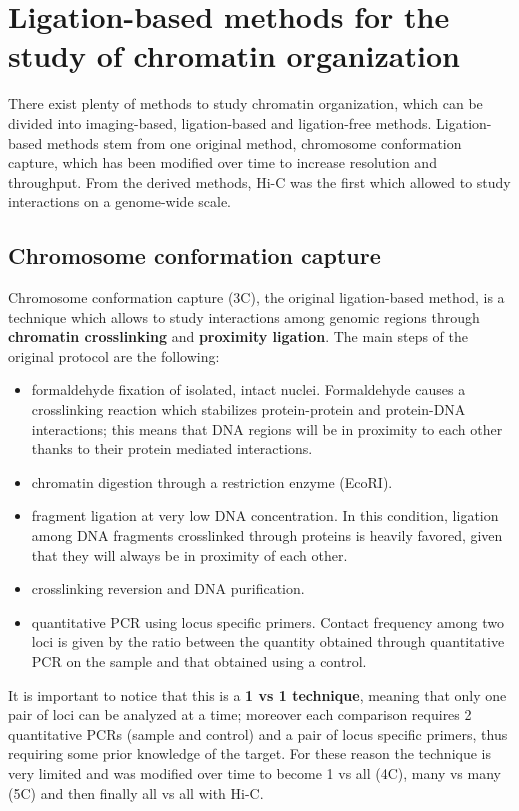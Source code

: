 \newpage
\section{Ligation-based methods for the study of chromatin organization}

There exist plenty of methods to study chromatin organization, which can be divided into imaging-based, ligation-based and ligation-free methods. Ligation-based methods stem from one original method, chromosome conformation capture, which has been modified over time to increase resolution and throughput. From the derived methods, Hi-C was the first which allowed to study interactions on a genome-wide scale.

\subsection{Chromosome conformation capture}
Chromosome conformation capture (3C), the original ligation-based method, is a technique which allows to study interactions among genomic regions through \textbf{chromatin crosslinking} and \textbf{proximity ligation}\cite{3coriginal2002}. The main steps of the original protocol are the following:
\begin{itemize}\tightlist
  \item formaldehyde fixation of isolated, intact nuclei. Formaldehyde causes a crosslinking reaction which stabilizes protein-protein and protein-DNA interactions; this means that DNA regions will be in proximity to each other thanks to their protein mediated interactions. 
  \item chromatin digestion through a restriction enzyme (EcoRI).
  \item fragment ligation at very low DNA concentration. In this condition, ligation among DNA fragments crosslinked through proteins is heavily favored, given that they will always be in proximity of each other.
  \item crosslinking reversion and DNA purification.
  \item quantitative PCR using locus specific primers. Contact frequency among two loci is given by the ratio between the quantity obtained through quantitative PCR on the sample and that obtained using a control.
\end{itemize}
It is important to notice that this is a \textbf{1 vs 1 technique}, meaning that only one pair of loci can be analyzed at a time; moreover each comparison requires 2 quantitative PCRs (sample and control) and a pair of locus specific primers, thus requiring some prior knowledge of the target. For these reason the technique is very limited and was modified over time to become 1 vs all (4C\cite{4cprotocol2006}), many vs many (5C\cite{5cprotocol2006}) and then finally all vs all with Hi-C.


